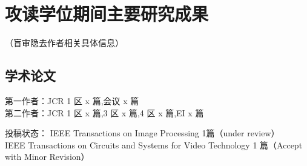 \section{攻读学位期间主要研究成果} %

\ifblindreview
\noindent
（盲审隐去作者相关具体信息）
\fi
\subsection*{学术论文}

\ifblindreview

\noindent
第一作者：JCR 1 区 x 篇,会议 x 篇 \\{}
第二作者：JCR 1 区 x 篇,3 区 x 篇,4 区 x 篇,EI x 篇 

\noindent
投稿状态： 
IEEE Transactions on Image Processing 1篇（under review）\\{}
IEEE Transactions on Circuits and Systems for Video Technology 1 篇（Accept with Minor Revision）
\else
